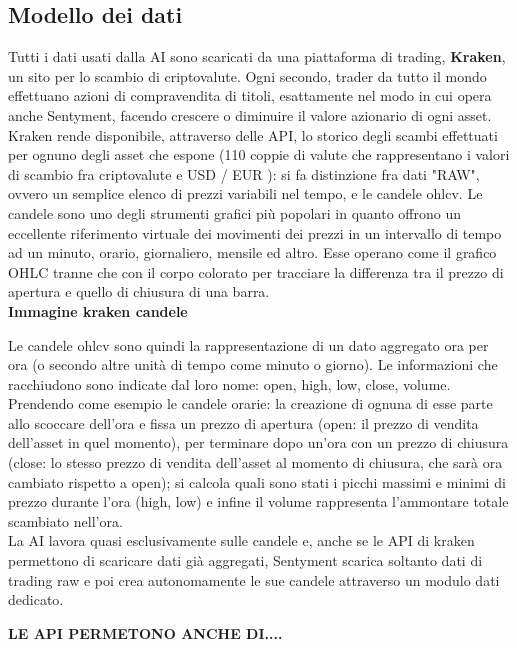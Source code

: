 \documentclass{article}
\begin{document}
	\subsection{Modello dei dati}
		Tutti i dati usati dalla AI sono scaricati da una piattaforma di trading, \textbf{Kraken}, un sito per lo scambio di criptovalute. Ogni secondo, trader da tutto il mondo effettuano azioni di compravendita di titoli, esattamente nel modo in cui opera anche Sentyment, facendo crescere o diminuire il valore azionario di ogni asset. Kraken rende disponibile, attraverso delle API, lo storico degli scambi effettuati per ognuno degli asset che espone (110 coppie di valute che rappresentano i valori di scambio fra criptovalute e USD / EUR ): si fa distinzione fra dati "RAW", ovvero un semplice elenco di prezzi variabili nel tempo, e le candele ohlcv. Le candele sono uno degli strumenti grafici più popolari in quanto offrono un eccellente riferimento virtuale dei movimenti dei prezzi in un intervallo di tempo ad un minuto, orario, giornaliero, mensile ed altro. Esse operano come il grafico OHLC tranne che con il corpo colorato per tracciare la differenza tra il prezzo di apertura e quello di chiusura di una barra.\\
		
		\textbf{Immagine kraken candele}
		
		
		Le candele ohlcv sono quindi la rappresentazione di un dato aggregato ora per ora (o secondo altre unità di tempo come minuto o giorno). Le informazioni che racchiudono sono indicate dal loro nome: open, high, low, close, volume. Prendendo come esempio le candele orarie: la creazione di ognuna di esse parte allo scoccare dell'ora e fissa un prezzo di apertura (open: il prezzo di vendita dell'asset in quel momento), per terminare dopo un'ora con un prezzo di chiusura (close: lo stesso prezzo di vendita dell'asset al momento di chiusura, che sarà ora cambiato rispetto a open); si calcola quali sono stati i picchi massimi e minimi di prezzo durante l'ora (high, low) e infine il volume rappresenta l'ammontare totale scambiato nell'ora.\\
		La AI lavora quasi esclusivamente sulle candele e, anche se le API di kraken permettono di scaricare dati già aggregati, Sentyment scarica soltanto dati di trading raw e poi crea autonomamente le sue candele attraverso un modulo dati dedicato.
		
		
		\textbf{LE API PERMETONO ANCHE DI....}
		
		
		
		
\end{document}
